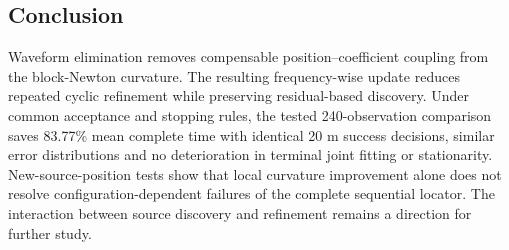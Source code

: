 \documentclass[a4paper,12pt,review]{cas-sc}
\begin{document}
\newpage
\begin{samepage}
\section{Conclusion}
Waveform elimination removes compensable position--coefficient coupling from the block-Newton curvature. The resulting frequency-wise update reduces repeated cyclic refinement while preserving residual-based discovery. Under common acceptance and stopping rules, the tested 240-observation comparison saves 83.77\% mean complete time with identical 20 m success decisions, similar error distributions and no deterioration in terminal joint fitting or stationarity. New-source-position tests show that local curvature improvement alone does not resolve configuration-dependent failures of the complete sequential locator. The interaction between source discovery and refinement remains a direction for further study.
\end{samepage}



\end{document}
